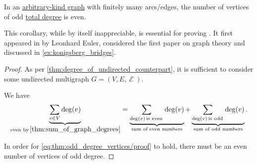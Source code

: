 \begin{corollary}\label{thm:odd_degree_vertices}
  In an \hyperref[rem:arbitrary_kind_graph]{arbitrary-kind graph} with finitely many arcs/edges, the number of vertices of odd \hyperref[def:graph_cardinality/directed_degree]{total degree} is even.
\end{corollary}
\begin{comments}
  \item This corollary, while by itself inappreciable, is essential for proving . It first appeared in \cite{Euler1741Bridges} by Leonhard Euler, considered the first paper on graph theory and discussed in \cref{ex:konigsberg_bridges}.
\end{comments}
\begin{proof}
  As per \cref{thm:degree_of_undirected_counterpart}, it is sufficient to consider some undirected multigraph \( G = (V, E, \mscrE) \).

  We have
  \begin{equation}\label{eq:thm:odd_degree_vertices/proof}
    \underbrace{\sum_{v \in V} \deg(v)}_{\T*{even by} \cref{thm:sum_of_graph_degrees}} = \underbrace{\sum_{\deg(v) \T*{is even}} \deg(v)}_{\T{sum of even numbers}} + \underbrace{\sum_{\deg(v) \T*{is odd}} \deg(v)}_{\T{sum of odd numbers}}.
  \end{equation}

  In order for \eqref{eq:thm:odd_degree_vertices/proof} to hold, there must be an even number of vertices of odd degree.
\end{proof}

